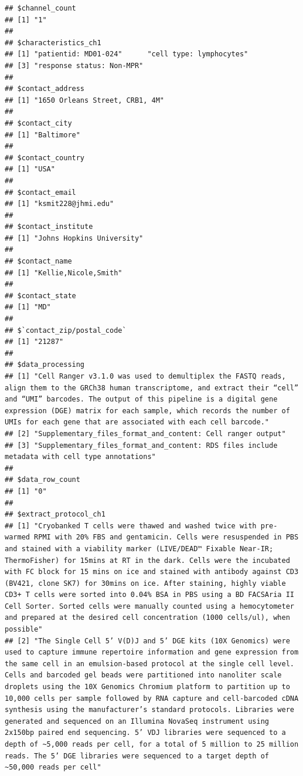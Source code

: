 \documentclass[
]{book}
\begin{document}
\begin{verbatim}
## $channel_count
## [1] "1"
## 
## $characteristics_ch1
## [1] "patientid: MD01-024"      "cell type: lymphocytes"  
## [3] "response status: Non-MPR"
## 
## $contact_address
## [1] "1650 Orleans Street, CRB1, 4M"
## 
## $contact_city
## [1] "Baltimore"
## 
## $contact_country
## [1] "USA"
## 
## $contact_email
## [1] "ksmit228@jhmi.edu"
## 
## $contact_institute
## [1] "Johns Hopkins University"
## 
## $contact_name
## [1] "Kellie,Nicole,Smith"
## 
## $contact_state
## [1] "MD"
## 
## $`contact_zip/postal_code`
## [1] "21287"
## 
## $data_processing
## [1] "Cell Ranger v3.1.0 was used to demultiplex the FASTQ reads, align them to the GRCh38 human transcriptome, and extract their “cell” and “UMI” barcodes. The output of this pipeline is a digital gene expression (DGE) matrix for each sample, which records the number of UMIs for each gene that are associated with each cell barcode."
## [2] "Supplementary_files_format_and_content: Cell ranger output"                                                                                                                                                                                                                                                                              
## [3] "Supplementary_files_format_and_content: RDS files include metadata with cell type annotations"                                                                                                                                                                                                                                           
## 
## $data_row_count
## [1] "0"
## 
## $extract_protocol_ch1
## [1] "Cryobanked T cells were thawed and washed twice with pre-warmed RPMI with 20% FBS and gentamicin. Cells were resuspended in PBS and stained with a viability marker (LIVE/DEAD™ Fixable Near-IR; ThermoFisher) for 15mins at RT in the dark. Cells were the incubated with FC block for 15 mins on ice and stained with antibody against CD3 (BV421, clone SK7) for 30mins on ice. After staining, highly viable CD3+ T cells were sorted into 0.04% BSA in PBS using a BD FACSAria II Cell Sorter. Sorted cells were manually counted using a hemocytometer and prepared at the desired cell concentration (1000 cells/ul), when possible"                                                                                                                                                      
## [2] "The Single Cell 5’ V(D)J and 5’ DGE kits (10X Genomics) were used to capture immune repertoire information and gene expression from the same cell in an emulsion-based protocol at the single cell level. Cells and barcoded gel beads were partitioned into nanoliter scale droplets using the 10X Genomics Chromium platform to partition up to 10,000 cells per sample followed by RNA capture and cell-barcoded cDNA synthesis using the manufacturer’s standard protocols. Libraries were generated and sequenced on an Illumina NovaSeq instrument using 2x150bp paired end sequencing. 5’ VDJ libraries were sequenced to a depth of ~5,000 reads per cell, for a total of 5 million to 25 million reads. The 5’ DGE libraries were sequenced to a target depth of ~50,000 reads per cell"

\end{verbatim}
\end{document}
